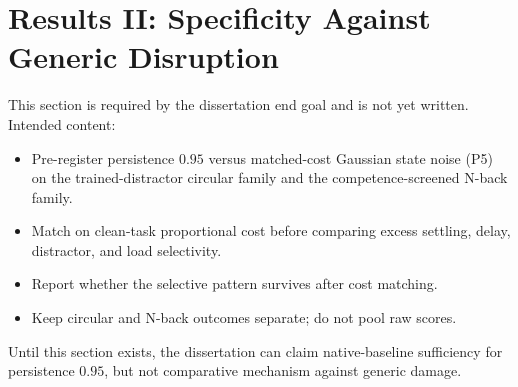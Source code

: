 \section{Results II: Specificity Against Generic Disruption}
\label{ch:results-specificity}

\begin{scaffold}
This section is required by the dissertation end goal and is not yet written.
Intended content:
\begin{itemize}[leftmargin=*]
  \item Pre-register persistence $0.95$ versus matched-cost Gaussian state
        noise (P5) on the trained-distractor circular family and the
        competence-screened N-back family.
  \item Match on clean-task proportional cost before comparing excess
        settling, delay, distractor, and load selectivity.
  \item Report whether the selective pattern survives after cost matching.
  \item Keep circular and N-back outcomes separate; do not pool raw scores.
\end{itemize}
Until this section exists, the dissertation can claim native-baseline
sufficiency for persistence $0.95$, but not comparative mechanism against
generic damage.
\end{scaffold}
